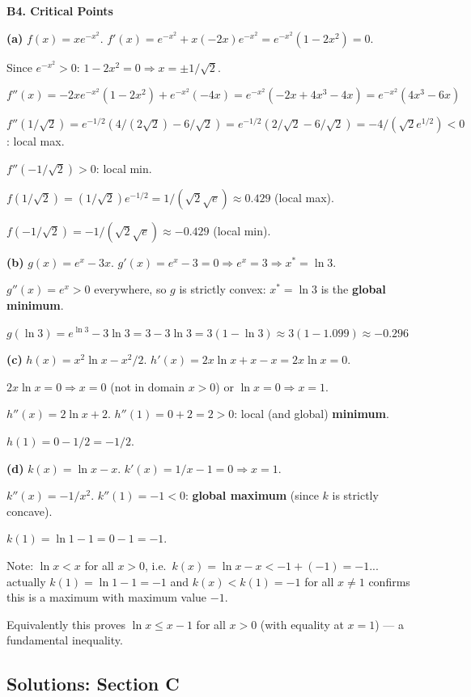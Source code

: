\documentclass[12pt, a4paper]{article}
\theoremstyle{definition}
\begin{document}
\begin{solbox}
\textbf{B4. Critical Points}

\textbf{(a)} $f(x)=xe^{-x^2}$. $f'(x)=e^{-x^2}+x(-2x)e^{-x^2}=e^{-x^2}(1-2x^2)=0$.

Since $e^{-x^2}>0$: $1-2x^2=0 \Rightarrow x=\pm 1/\sqrt{2}$.

$f''(x) = -2xe^{-x^2}(1-2x^2)+e^{-x^2}(-4x)=e^{-x^2}(-2x+4x^3-4x)=e^{-x^2}(4x^3-6x)$

$f''(1/\sqrt{2}) = e^{-1/2}(4/(2\sqrt{2})-6/\sqrt{2}) = e^{-1/2}(2/\sqrt{2}-6/\sqrt{2}) = -4/(\sqrt{2}e^{1/2})<0$: local max.

$f''(-1/\sqrt{2}) > 0$: local min.

$f(1/\sqrt{2})=(1/\sqrt{2})e^{-1/2}=1/(\sqrt{2}\sqrt{e})\approx 0.429$ (local max).

$f(-1/\sqrt{2})=-1/(\sqrt{2}\sqrt{e})\approx-0.429$ (local min).

\textbf{(b)} $g(x)=e^x-3x$. $g'(x)=e^x-3=0 \Rightarrow e^x=3 \Rightarrow x^*=\ln 3$.

$g''(x)=e^x>0$ everywhere, so $g$ is strictly convex: $x^*=\ln 3$ is the \textbf{global minimum}.

$g(\ln 3) = e^{\ln 3}-3\ln 3 = 3-3\ln 3 = 3(1-\ln 3)\approx 3(1-1.099)\approx -0.296$

\textbf{(c)} $h(x)=x^2\ln x-x^2/2$. $h'(x)=2x\ln x+x-x=2x\ln x=0$.

$2x\ln x=0 \Rightarrow x=0$ (not in domain $x>0$) or $\ln x=0 \Rightarrow x=1$.

$h''(x)=2\ln x+2$. $h''(1)=0+2=2>0$: local (and global) \textbf{minimum}.

$h(1)=0-1/2=-1/2$.

\textbf{(d)} $k(x)=\ln x - x$. $k'(x)=1/x-1=0 \Rightarrow x=1$.

$k''(x)=-1/x^2$. $k''(1)=-1<0$: \textbf{global maximum} (since $k$ is strictly concave).

$k(1)=\ln 1-1=0-1=-1$.

Note: $\ln x < x$ for all $x>0$, i.e.\ $k(x)=\ln x-x<-1+(-1)=-1$... actually $k(1)=\ln 1-1=-1$ and $k(x)<k(1)=-1$ for all $x\neq 1$ confirms this is a maximum with maximum value $-1$.

Equivalently this proves $\ln x \leq x-1$ for all $x>0$ (with equality at $x=1$) --- a fundamental inequality.
\end{solbox}

\subsection{Solutions: Section C}
\end{document}
